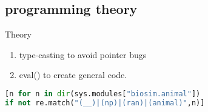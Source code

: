 \documentclass[12pt]{beamer}
\begin{document}
\subsection{programming theory}

\begin{frame}{Theory}
\begin{enumerate}
\item type-casting to avoid pointer bugs
\item eval() to create general code.
\end{enumerate}
\end{frame}

\begin{frame}[fragile]

\begin{lstlisting}[language=Python,basicstyle=\small]
[n for n in dir(sys.modules["biosim.animal"]) 
if not re.match("(__)|(np)|(ran)|(animal)",n)]
\end{lstlisting}

\end{frame}
\end{document}
